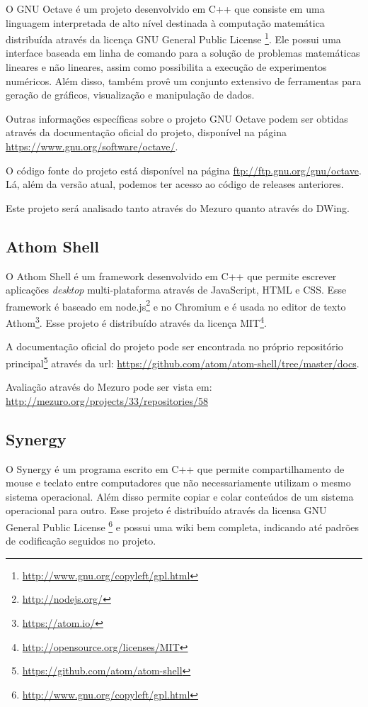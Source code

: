 O GNU Octave é um projeto desenvolvido em C++ que consiste em uma linguagem interpretada de alto nível destinada à computação matemática distribuída através da licença GNU General Public License \footnote{\url{http://www.gnu.org/copyleft/gpl.html}}. Ele possui uma interface baseada em linha de comando para a solução de problemas matemáticas lineares e não lineares, assim como possibilita a execução de experimentos numéricos. Além disso, também provê um conjunto extensivo de ferramentas para geração de gráficos, visualização e manipulação de dados.

Outras informações específicas sobre o projeto GNU Octave podem ser obtidas através da documentação oficial do projeto, disponível na página \url{https://www.gnu.org/software/octave/}.

O código fonte do projeto está disponível na página \url{ftp://ftp.gnu.org/gnu/octave}. Lá, além da versão atual, podemos ter acesso ao código de releases anteriores.

Este projeto será analisado tanto através do Mezuro quanto através do DWing.


\subsection{Athom Shell}
\label{section-athom}

O Athom Shell é um framework desenvolvido em C++ que permite escrever aplicações \emph{desktop} multi-plataforma através de JavaScript, HTML e CSS. Esse framework é baseado em node.js\footnote{\url{http://nodejs.org/}} e no Chromium e é usada no editor de texto Athom\footnote{\url{https://atom.io/}}. Esse projeto é distribuído através da licença MIT\footnote{\url{http://opensource.org/licenses/MIT}}.

A documentação oficial do projeto pode ser encontrada no próprio repositório principal\footnote{\url{https://github.com/atom/atom-shell}} através da url: \url{https://github.com/atom/atom-shell/tree/master/docs}.

Avaliação através do Mezuro pode ser vista em: \url{http://mezuro.org/projects/33/repositories/58}

\subsection{Synergy}
\label{section-synergy}

O Synergy é um programa escrito em C++ que permite compartilhamento de mouse e teclato entre computadores que não necessariamente utilizam o mesmo sistema operacional. Além disso permite copiar e colar conteúdos de um sistema operacional para outro. Esse projeto é distribuído através da licensa GNU General Public License \footnote{\url{http://www.gnu.org/copyleft/gpl.html}} e possui uma wiki bem completa, indicando até padrões de codificação seguidos no projeto.

